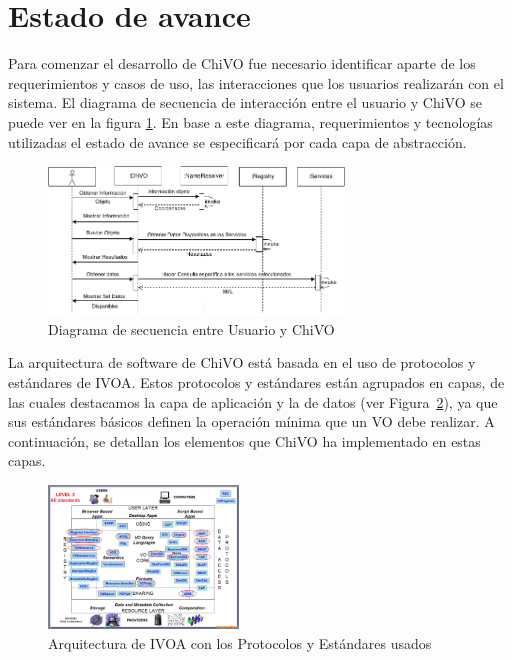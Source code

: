 \section{Estado de avance}

Para comenzar el desarrollo de ChiVO fue necesario identificar aparte de los
requerimientos y casos de uso, las interacciones que los usuarios realizarán
con el sistema. El diagrama de secuencia de interacción entre el usuario y
ChiVO se puede ver en la figura \ref{fig:secuencia}.
En base a este diagrama, requerimientos y tecnologías utilizadas el estado de
avance se especificará por cada capa de abstracción.

\begin{figure}[h!t]
    \centering
    \includegraphics[width=0.7\textwidth]{images/secuencia.png}
    \caption{Diagrama de secuencia entre Usuario y ChiVO}
    \label{fig:secuencia}
\end{figure}

La arquitectura de software de ChiVO está basada en el uso de protocolos y estándares de
IVOA. Estos protocolos y estándares están agrupados en capas, de las cuales
destacamos la capa de aplicación y la de datos (ver Figura~\ref{fig:ivoarch}),
ya que sus estándares básicos definen la operación mínima que un VO debe
realizar. A continuación, se detallan los elementos que ChiVO ha implementado
en estas capas.
\begin{figure}[ht]
    \centering
    \includegraphics[width=0.45\textwidth]{images/arquitectura_2.png}
    \caption{Arquitectura de IVOA con los Protocolos y Estándares usados}
    \label{fig:ivoarch}
\end{figure}

